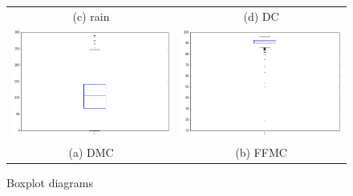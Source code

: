 \begin{figure}
\begin{tabular}{cc}
(c) rain & (d) DC \\[6pt]
  \includegraphics[width=65mm]{images/boxplots/DMC.png} &   \includegraphics[width=65mm]{images/boxplots/FFMC.png} \\
(a) DMC & (b) FFMC \\[6pt]
\end{tabular}
\caption{Boxplot diagrams}
\end{figure}

\newpage

